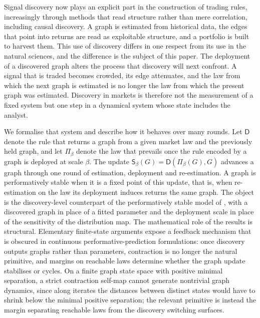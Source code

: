\documentclass[11pt]{article}
\theoremstyle{plain}
\theoremstyle{definition}
\newcommand{\Dop}{\mathsf{D}}
\newcommand{\Pidep}{\Pi_\beta}
\newcommand{\Sbeta}{\mathsf{S}_\beta}
\begin{document}
Signal discovery now plays an explicit part in the construction of trading rules, increasingly through methods that read structure rather than mere correlation, including causal discovery. A graph is estimated from historical data, the edges that point into returns are read as exploitable structure, and a portfolio is built to harvest them. This use of discovery differs in one respect from its use in the natural sciences, and the difference is the subject of this paper. The deployment of a discovered graph alters the process that discovery will next confront. A signal that is traded becomes crowded, its edge attenuates, and the law from which the next graph is estimated is no longer the law from which the present graph was estimated. Discovery in markets is therefore not the measurement of a fixed system but one step in a dynamical system whose state includes the analyst.

We formalise that system and describe how it behaves over many rounds. Let $\Dop$ denote the rule that returns a graph from a given market law and the previously held graph, and let $\Pidep$ denote the law that prevails once the rule encoded by a graph is deployed at scale $\beta$. The update $\Sbeta(G)=\Dop(\Pidep(G),G)$ advances a graph through one round of estimation, deployment and re-estimation. A graph is performatively stable when it is a fixed point of this update, that is, when re-estimation on the law its deployment induces returns the same graph. The object is the discovery-level counterpart of the performatively stable model of \citet{perdomo2020}, with a discovered graph in place of a fitted parameter and the deployment scale in place of the sensitivity of the distribution map. The mathematical role of the results is structural. Elementary finite-state arguments expose a feedback mechanism that is obscured in continuous performative-prediction formulations: once discovery outputs graphs rather than parameters, contraction is no longer the natural primitive, and margins on reachable laws determine whether the graph update stabilises or cycles. On a finite graph state space with positive minimal separation, a strict contraction self-map cannot generate nontrivial graph dynamics, since along iterates the distances between distinct states would have to shrink below the minimal positive separation; the relevant primitive is instead the margin separating reachable laws from the discovery switching surfaces.
\end{document}
